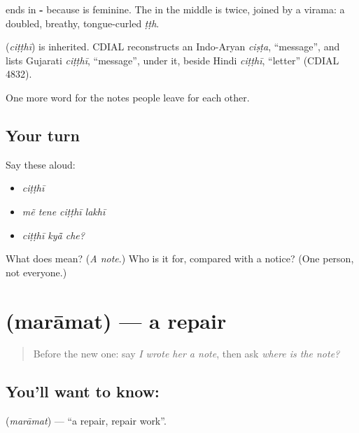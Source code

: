 \textbf{} ends in \textbf{-} because \textbf{} is feminine. The \textbf{} in the middle is \textbf{} twice, joined by a virama: a doubled, breathy, tongue-curled \emph{ṭṭh}.

\begin{cousinweb}
\textbf{} (\emph{ciṭṭhī}) is inherited. CDIAL reconstructs an Indo-Aryan \emph{ciṣṭa}, \textquotedblleft{}message\textquotedblright{}, and lists Gujarati \emph{ciṭṭhī}, \textquotedblleft{}message\textquotedblright{}, under it, beside Hindi \emph{ciṭṭhī}, \textquotedblleft{}letter\textquotedblright{} (CDIAL 4832).
\end{cousinweb}

\begin{grammarlens}[title={What you've built}]
One more word for the notes people leave for each other.
\end{grammarlens}

\subsection*{Your turn}
Say these aloud:

\begin{itemize}
\raggedright
  \item \emph{ciṭṭhī}
  \item \emph{mẽ tene ciṭṭhī lakhī}
  \item \emph{ciṭṭhī kyā̃ che?}
\end{itemize}

\begin{tcolorbox}[breakable,colback=teal!4,colframe=teal!35!black,title={Before you move on}]
What does \textbf{} mean? (\emph{A note}.) Who is it for, compared with a notice? (One person, not everyone.)
\end{tcolorbox}
\section[\texorpdfstring{\gu{મરામત} (marāmat)}{મરામત (marāmat)}]{ (marāmat) — a repair}

\label{lesson:GU-C152-maramat}



\begin{quote}
Before the new one: say \emph{I wrote her a note}, then ask \emph{where is the note?}
\end{quote}

\subsection*{You'll want to know: }
\textbf{} (\emph{marāmat}) — \textquotedblleft{}a repair, repair work\textquotedblright{}.

